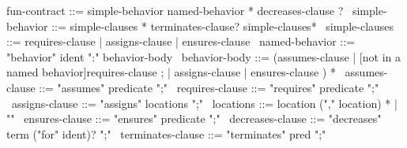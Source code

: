 \begin{syntax}
  fun-contract ::= simple-behavior named-behavior * decreases-clause ?
  \
  simple-behavior ::= simple-clauses * terminates-clause? simple-clauses*
  \
  simple-clauses ::= requires-clause | assigns-clause | ensures-clause
  \
  named-behavior ::= "behavior" ident ":" behavior-body
  \
  behavior-body ::= (assumes-clause |
                     {[not in a named behavior]requires-clause} ;
                    | assigns-clause | ensures-clause ) *
              \
  assumes-clause ::= "assumes" predicate ";"
  \
  requires-clause ::= "requires" predicate ";"
  \
  assigns-clause ::= "assigns" locations ";"
  \
  locations ::= location ("," location) * | "\nothing"
  \
  ensures-clause ::= "ensures" predicate ";"
  \
  decreases-clause ::= "decreases" term ("for" ident)? ";"
  \
  terminates-clause ::= "terminates" pred ";"
\end{syntax}
